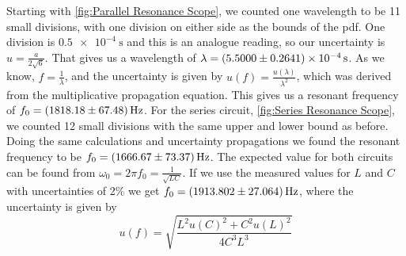 \documentclass[12pt]{article}
\numberwithin{equation}{section}
\numberwithin{figure}{section}
\begin{document}
    \newline
    \newline
    Starting with \autoref{fig:Parallel Resonance Scope}, we counted one wavelength to be 11 small 
    divisions, with one division on either side as the bounds of the pdf. One division is 
    $\SI{0.5e-4}{\second}$ and this is an analogue reading, so our uncertainty is 
    $u=\frac{a}{2\sqrt{6}}$. That gives us a wavelength of $\lambda=\SI{5.5\pm0.2641e-4}{\second}$. 
    As we know, $f=\frac{1}{\lambda}$, and the uncertainty is given by 
    $u(f)=\frac{u(\lambda)}{\lambda^2}$, which was derived from the multiplicative propagation 
    equation. This gives us a resonant frequency of $f_0=\SI{1818.18\pm67.48}{\hertz}$. \newline
    \newline
    For the series circuit, \autoref{fig:Series Resonance Scope}, we counted 12 small divisions 
    with the same upper and lower bound as before. Doing the same calculations and uncertainty propagations 
    we found the resonant frequency to be $f_0=\SI{1666.67\pm73.37}{\hertz}$. The expected value for 
    both circuits can be found from $\omega_0=2\pi f_0=\frac{1}{\sqrt{LC}}$. If we use the measured 
    values for $L$ and $C$ with uncertainties of 2\% we get $f_0=\SI{1913.802\pm27.064}{\hertz}$, 
    where the uncertainty is given by
    \begin{equation*}
        u(f)=\sqrt{\frac{L^2u(C)^2+C^2u(L)^2}{4C^3L^3}}
    \end{equation*} 
\end{document}
